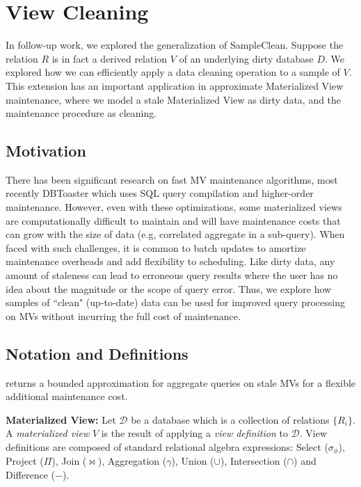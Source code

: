 \section{View Cleaning \cite{krishnan2015svc}}
In follow-up work, we explored the generalization of SampleClean.
Suppose the relation $R$ is in fact a derived relation $V$ of an underlying dirty database $D$.
We explored how we can efficiently apply a data cleaning operation to a sample of $V$.
This extension has an important application in approximate Materialized View maintenance, where we model a stale Materialized View as dirty data, and the maintenance procedure as cleaning.  

\subsection{Motivation}
There has been significant research on fast MV maintenance algorithms, most recently DBToaster \cite{DBLP:journals/vldb/KochAKNNLS14} which uses SQL query compilation and higher-order maintenance.
However, even with these optimizations, some materialized views are computationally difficult to maintain and will have maintenance costs that can grow with the size of data (e.g, correlated aggregate in a sub-query).
When faced with such challenges, it is common to batch updates to amortize maintenance overheads and add flexibility to scheduling.
Like dirty data, any amount of staleness can lead to erroneous query results where the user has no idea about the magnitude or the scope of query error. 
Thus, we explore how samples of ``clean" (up-to-date) data can be used for improved query processing on MVs without incurring the full cost of maintenance.

\subsection{Notation and Definitions}\label{notation}
\svc returns a bounded approximation for aggregate queries on stale MVs for a flexible additional maintenance cost.

\noindent \textbf{Materialized View:} Let $\mathcal{D}$ be a database which is a collection of relations $\{R_i\}$. 
A \emph{materialized view} $V$ is the result of applying a \emph{view definition} to $\mathcal{D}$. 
View definitions are composed of standard relational algebra expressions: Select ($\sigma_{\phi}$), Project ($\Pi$), Join ($\bowtie$), Aggregation ($\gamma$), Union ($\cup$), Intersection ($\cap$) and Difference ($-$). 

